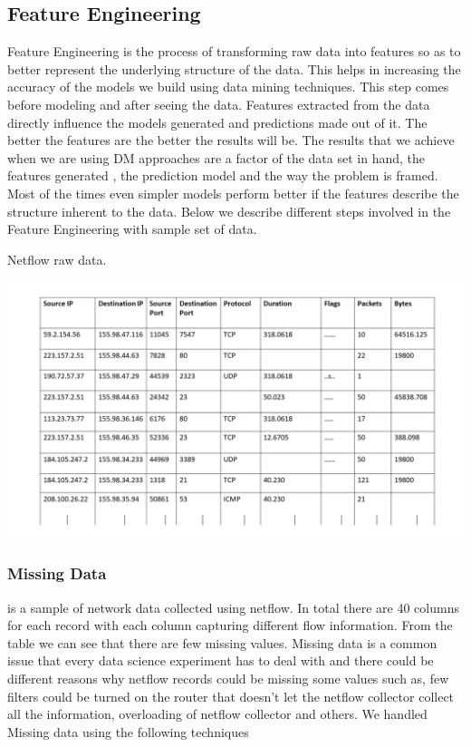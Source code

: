 \subsection{Feature Engineering}

Feature Engineering is the process of transforming raw
data into features so as to better represent the underlying structure of the data. This helps in increasing the accuracy of the models we build using data mining techniques. This step comes before modeling and after seeing the data.
Features extracted from the data directly influence the models generated and predictions made out of it. The better the features are the better the results will be. The results that we achieve when we are using DM approaches are a factor of the data set in hand, the features generated , the prediction model and the way the problem is framed. Most of the times even simpler models perform better if the features describe the structure inherent to the data. 
Below we describe different steps involved in the Feature Engineering with sample set of data.
\begin{table}[t]
	\caption{Netflow raw data.}%
	\centerline{\includegraphics[scale = 0.5]{raw_data.pdf}}	
\end{table}
 
\subsubsection{Missing Data} 

 is a sample of network data collected using netflow. In total there are 40 columns for each record with each column capturing different flow information. From the table we can see that there are few missing values. Missing data is a common issue that every data science experiment has to deal with and there could be different reasons why netflow records could be missing some values such as, few filters could be turned on the router that doesn't let the netflow collector collect all the information, overloading of netflow collector and others. We handled Missing data using the following techniques 

